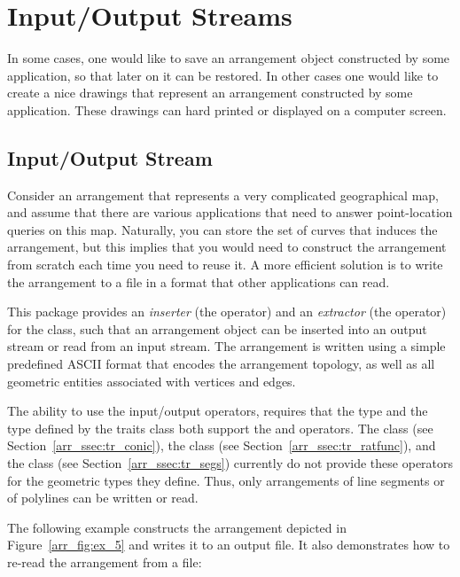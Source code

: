 \section{Input/Output Streams\label{arr_sec:io}}

In some cases, one would like to save an arrangement object constructed
by some application, so that later on it can be restored. In other cases 
one would like to create a nice drawings that represent an arrangement 
constructed by some application. These drawings can hard printed or
displayed on a computer screen.

\subsection{Input/Output Stream}\label{arr_ssec:io_stream}
Consider an arrangement that represents a very complicated geographical 
map, and assume that there are various applications that need to answer 
point-location queries on this map. Naturally, you can store the set of 
curves that induces the arrangement, but this implies that you would need 
to construct the arrangement from scratch each time you need to reuse it.
A more efficient solution is to write the arrangement to a file in a format 
that other applications can read.

This package provides an {\em inserter} (the \ccc{<<} operator) and an 
{\em extractor} (the \ccc{>>} operator) for the 
 class, such that an arrangement object 
can be inserted into an output stream or read from an input stream. The 
arrangement is written using a simple predefined ASCII format that encodes 
the arrangement topology, as well as all geometric entities associated with 
vertices and edges.

The ability to use the input/output operators, requires that the 
 type and the  type defined by the 
traits class both support the \ccc{<<} and \ccc{>>} operators. The 
 class (see Section~\ref{arr_ssec:tr_conic}), the 
 class (see Section~\ref{arr_ssec:tr_ratfunc}),
and the  class (see Section~\ref{arr_ssec:tr_segs})
currently do not provide these operators for the geometric types they define. 
Thus, only arrangements of line segments or of polylines can be written or 
read.

The following example constructs the arrangement depicted in 
Figure~\ref{arr_fig:ex_5} and writes it to an output file. It also
demonstrates how to re-read the arrangement from a file:

